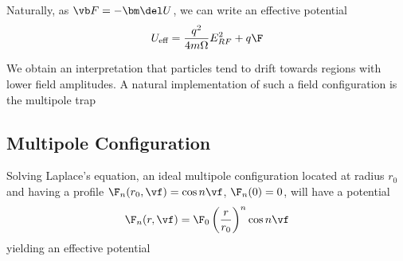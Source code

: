 \documentclass[12pt]{article}
\begin{document}
Naturally, as \( \vb F=-\bm\del U \), we can write an effective potential
\[ U_\text{eff}=\frac{q^2}{4m\Omega}E_{RF}^2+q\F \]

We obtain an interpretation that particles tend to drift towards regions with lower field amplitudes. A natural implementation of such a field configuration is the multipole trap

\subsection{Multipole Configuration}
Solving Laplace's equation, an ideal multipole configuration located at radius \( r_0 \) and having a profile \( \F_n(r_0,\vf)=\cos n\vf \), \( \F_n(0)=0 \), will have a potential
\[ \F_n(r,\vf)=\F_0 \left(  \frac{r}{r_0}\right)^n\cos n\vf \]
yielding an effective potential 



\end{document}
